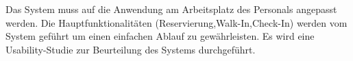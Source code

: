 \documentclass[../../Pflichtenheft.tex]{subfiles}
\begin{document}
    Das System muss auf die Anwendung am Arbeitsplatz des Personals angepasst werden.
    Die Hauptfunktionalitäten (Reservierung,Walk-In,Check-In) werden vom System geführt um einen einfachen Ablauf zu gewährleisten.
    Es wird eine Usability-Studie zur Beurteilung des Systems durchgeführt.
\end{document}
